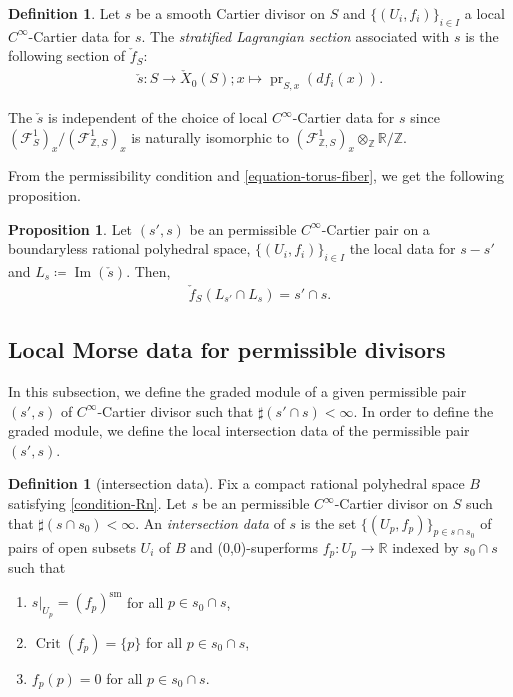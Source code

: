 \documentclass[a4paper,dvipdfmx,reqno,12pt]{amsart}
\theoremstyle{definition}
\newtheorem{definition}[theorem]{Definition}
\newtheorem{proposition}[theorem]{Proposition}
\newcommand{\deq}{\coloneqq}
\newcommand{\opn}[1]{\operatorname{#1}}
\numberwithin{equation}{section}
\begin{document}
\begin{definition}
Let $s$ be a smooth 
Cartier divisor on $S$ and $\{(U_i,f_i)\}_{i\in I}$ a local
$C^{\infty}$-Cartier data for $s$. 
The \emph{stratified Lagrangian section} associated with $s$ is the following
section of $\check{f}_S$:
\begin{align}
\check{s}\colon S \to \check{X}_0(S); x \mapsto \opn{pr}_{S,x} (df_i(x)).
\end{align}
\end{definition}

The $\check{s}$ is independent of the choice of local 
$C^{\infty}$-Cartier data for $s$ since 
$(\mathcal{F}^{1}_{S})_x/(\mathcal{F}^{1}_{\mathbb{Z},S})_x$
is naturally isomorphic to
$(\mathcal{F}^{1}_{\mathbb{Z},S})_x
\otimes_{\mathbb{Z}}\mathbb{R}/\mathbb{Z}$.
 

From the permissibility condition and
\cref{equation-torus-fiber}, we get the following proposition.

\begin{proposition}
Let $(s',s)$ be an permissible $C^{\infty}$-Cartier pair
on a boundaryless rational polyhedral space, 
$\{(U_i,f_i)\}_{i\in I}$ the local data 
for $s-s'$ and $L_s\deq \opn{Im}(\check{s})$.
Then,
\begin{align}
\check{f}_S(L_{s'}\cap L_s)=s'\cap s.
\end{align}

\end{proposition}






 
\subsection{Local Morse data for permissible divisors}

In this subsection, we
define the graded module of a given permissible pair 
$(s',s)$ of $C^{\infty}$-Cartier divisor such that 
$\sharp (s'\cap s)<\infty$.
In order to define the graded module, we define the 
local intersection data of 
the permissible pair $(s',s)$.

\begin{definition}[{intersection data}]
Fix a compact rational polyhedral space $B$ satisfying 
\cref{condition-Rn}.
Let $s$ be an permissible $C^{\infty}$-Cartier divisor 
on $S$ such that $\sharp (s\cap s_0)<\infty$. 
An \emph{intersection data} of $s$ is the set 
$\{(U_p,f_p)\}_{p\in s\cap s_0}$ of pairs of open subsets
$U_i$ of $B$ and (0,0)-superforms
$f_p\colon U_p \to \mathbb{R}$ indexed by 
$ s_0\cap s$ 
such that
\begin{enumerate}
\item $s|_{U_p}=(f_p)^{\mathrm{sm}}$
for all $p\in s_0\cap s$,
\item $\opn{Crit}(f_p)=\{p\}$ for all $p\in s_0\cap s$,
\item $f_p(p)=0$ for all $p\in s_0\cap s$.
\end{enumerate}
\end{definition}
\end{document}
